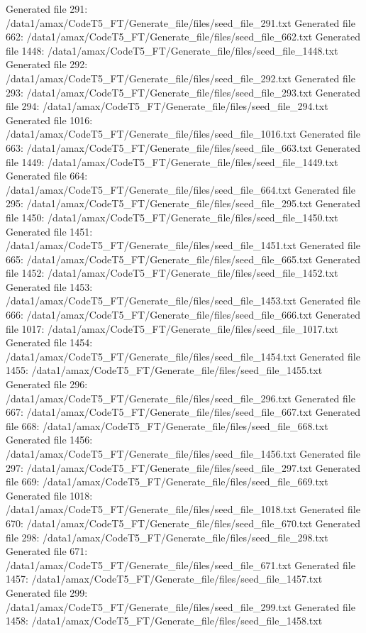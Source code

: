 Generated file 291: /data1/amax/CodeT5_FT/Generate_file/files/seed_file_291.txt
Generated file 662: /data1/amax/CodeT5_FT/Generate_file/files/seed_file_662.txt
Generated file 1448: /data1/amax/CodeT5_FT/Generate_file/files/seed_file_1448.txt
Generated file 292: /data1/amax/CodeT5_FT/Generate_file/files/seed_file_292.txt
Generated file 293: /data1/amax/CodeT5_FT/Generate_file/files/seed_file_293.txt
Generated file 294: /data1/amax/CodeT5_FT/Generate_file/files/seed_file_294.txt
Generated file 1016: /data1/amax/CodeT5_FT/Generate_file/files/seed_file_1016.txt
Generated file 663: /data1/amax/CodeT5_FT/Generate_file/files/seed_file_663.txt
Generated file 1449: /data1/amax/CodeT5_FT/Generate_file/files/seed_file_1449.txt
Generated file 664: /data1/amax/CodeT5_FT/Generate_file/files/seed_file_664.txt
Generated file 295: /data1/amax/CodeT5_FT/Generate_file/files/seed_file_295.txt
Generated file 1450: /data1/amax/CodeT5_FT/Generate_file/files/seed_file_1450.txt
Generated file 1451: /data1/amax/CodeT5_FT/Generate_file/files/seed_file_1451.txt
Generated file 665: /data1/amax/CodeT5_FT/Generate_file/files/seed_file_665.txt
Generated file 1452: /data1/amax/CodeT5_FT/Generate_file/files/seed_file_1452.txt
Generated file 1453: /data1/amax/CodeT5_FT/Generate_file/files/seed_file_1453.txt
Generated file 666: /data1/amax/CodeT5_FT/Generate_file/files/seed_file_666.txt
Generated file 1017: /data1/amax/CodeT5_FT/Generate_file/files/seed_file_1017.txt
Generated file 1454: /data1/amax/CodeT5_FT/Generate_file/files/seed_file_1454.txt
Generated file 1455: /data1/amax/CodeT5_FT/Generate_file/files/seed_file_1455.txt
Generated file 296: /data1/amax/CodeT5_FT/Generate_file/files/seed_file_296.txt
Generated file 667: /data1/amax/CodeT5_FT/Generate_file/files/seed_file_667.txt
Generated file 668: /data1/amax/CodeT5_FT/Generate_file/files/seed_file_668.txt
Generated file 1456: /data1/amax/CodeT5_FT/Generate_file/files/seed_file_1456.txt
Generated file 297: /data1/amax/CodeT5_FT/Generate_file/files/seed_file_297.txt
Generated file 669: /data1/amax/CodeT5_FT/Generate_file/files/seed_file_669.txt
Generated file 1018: /data1/amax/CodeT5_FT/Generate_file/files/seed_file_1018.txt
Generated file 670: /data1/amax/CodeT5_FT/Generate_file/files/seed_file_670.txt
Generated file 298: /data1/amax/CodeT5_FT/Generate_file/files/seed_file_298.txt
Generated file 671: /data1/amax/CodeT5_FT/Generate_file/files/seed_file_671.txt
Generated file 1457: /data1/amax/CodeT5_FT/Generate_file/files/seed_file_1457.txt
Generated file 299: /data1/amax/CodeT5_FT/Generate_file/files/seed_file_299.txt
Generated file 1458: /data1/amax/CodeT5_FT/Generate_file/files/seed_file_1458.txt
